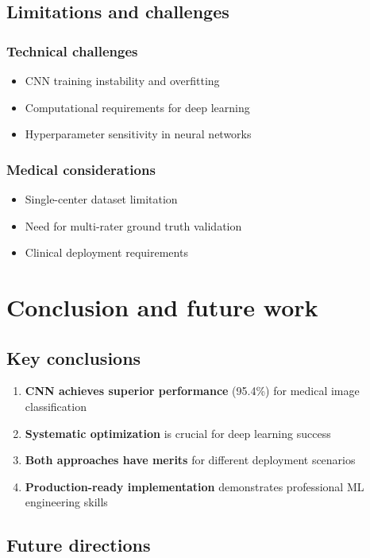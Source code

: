\documentclass[11pt]{article}
\begin{document}
\subsection{Limitations and challenges}

\subsubsection{Technical challenges}
\begin{itemize}
    \item CNN training instability and overfitting
    \item Computational requirements for deep learning
    \item Hyperparameter sensitivity in neural networks
\end{itemize}

\subsubsection{Medical considerations}
\begin{itemize}
    \item Single-center dataset limitation
    \item Need for multi-rater ground truth validation
    \item Clinical deployment requirements
\end{itemize}

\section{Conclusion and future work}

\subsection{Key conclusions}
\begin{enumerate}
    \item \textbf{CNN achieves superior performance} (95.4\%) for medical image classification
    \item \textbf{Systematic optimization} is crucial for deep learning success
    \item \textbf{Both approaches have merits} for different deployment scenarios
    \item \textbf{Production-ready implementation} demonstrates professional ML engineering skills
\end{enumerate}

\subsection{Future directions}
\end{document}
